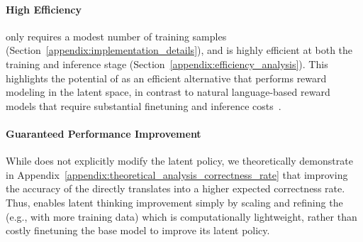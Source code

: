 \documentclass{article} %
\begin{document}
\paragraph*{High Efficiency} 
\LRM only requires a modest number of training samples (Section~\ref{appendix:implementation_details}), and \LTO is highly efficient at both the training and inference stage (Section~\ref{appendix:efficiency_analysis}). 
%
This highlights the potential of \LTO as an efficient alternative that performs reward modeling in the latent space, in contrast to natural language-based reward models that require substantial finetuning and inference costs~\citep{wang-etal-2024-math,lu2024autopsv,lightman2024lets}.
\paragraph*{Guaranteed Performance Improvement}%
While \LTO does not explicitly modify the latent policy, we theoretically demonstrate in Appendix~\ref{appendix:theoretical_analysis_correctness_rate} that improving the accuracy of the \LRM directly translates into a higher expected correctness rate. Thus, \LTO enables latent thinking improvement simply by scaling and refining the \LRM (e.g., with more training data) which is computationally lightweight, rather than costly finetuning the base model to improve its latent policy.

\end{document}
